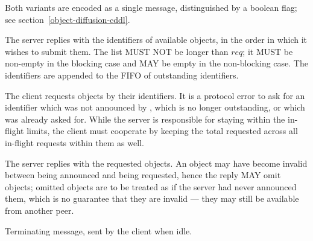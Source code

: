 \begin{description}
  Both variants are encoded as a single message, distinguished by a boolean
  flag; see section~\ref{object-diffusion-cddl}.
\item [\MsgReplyObjectIds{} {\boldmath ($\langle objectId \rangle$)}]
  The server replies with the identifiers of available objects, in the order in
  which it wishes to submit them.  The list MUST NOT be longer than $req$; it
  MUST be non-empty in the blocking case and MAY be empty in the non-blocking
  case.  The identifiers are appended to the FIFO of outstanding identifiers.
\item [\MsgRequestObjects{} {\boldmath ($\langle objectId \rangle$)}]
  The client requests objects by their identifiers.  It is a protocol error to
  ask for an identifier which was not announced by \MsgReplyObjectIds{}, which
  is no longer outstanding, or which was already asked for.  While the server
  is responsible for staying within the in-flight limits, the client must
  cooperate by keeping the total requested across all in-flight requests within
  them as well.
\item [\MsgReplyObjects{} {\boldmath ($\langle object \rangle$)}]
  The server replies with the requested objects.  An object may have become
  invalid between being announced and being requested, hence the reply MAY omit
  objects; omitted objects are to be treated as if the server had never
  announced them, which is no guarantee that they are invalid --- they may
  still be available from another peer.
\item [\MsgDone]
  Terminating message, sent by the client when idle.
\end{description}

